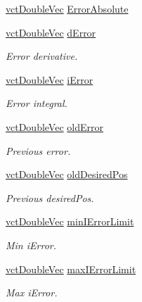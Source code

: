 \begin{DoxyCompactItemize}
\hyperlink{vct_dynamic_vector_types_8h_ade4b3068c86fb88f41af2e5187e491c2}{vct\-Double\-Vec} \hyperlink{classmts_p_i_d_abeb97a2bb603ecbe4636063effb6bf90}{Error\-Absolute}
\item 
\hyperlink{vct_dynamic_vector_types_8h_ade4b3068c86fb88f41af2e5187e491c2}{vct\-Double\-Vec} \hyperlink{classmts_p_i_d_ae171fb161398be9d69e7e647625c6cd6}{d\-Error}
\begin{DoxyCompactList}\small\item\em Error derivative. \end{DoxyCompactList}\item 
\hyperlink{vct_dynamic_vector_types_8h_ade4b3068c86fb88f41af2e5187e491c2}{vct\-Double\-Vec} \hyperlink{classmts_p_i_d_a89f471bbc0cb21cc9c64552a087c1a2c}{i\-Error}
\begin{DoxyCompactList}\small\item\em Error integral. \end{DoxyCompactList}\item 
\hyperlink{vct_dynamic_vector_types_8h_ade4b3068c86fb88f41af2e5187e491c2}{vct\-Double\-Vec} \hyperlink{classmts_p_i_d_ad9b05536756b06bd08374606fa615dc6}{old\-Error}
\begin{DoxyCompactList}\small\item\em Previous error. \end{DoxyCompactList}\item 
\hyperlink{vct_dynamic_vector_types_8h_ade4b3068c86fb88f41af2e5187e491c2}{vct\-Double\-Vec} \hyperlink{classmts_p_i_d_a9bd5876d1e7062eafd4dde4e2914adab}{old\-Desired\-Pos}
\begin{DoxyCompactList}\small\item\em Previous desired\-Pos. \end{DoxyCompactList}\item 
\hyperlink{vct_dynamic_vector_types_8h_ade4b3068c86fb88f41af2e5187e491c2}{vct\-Double\-Vec} \hyperlink{classmts_p_i_d_af87166f1f4a9f13c732be381f000d32a}{min\-I\-Error\-Limit}
\begin{DoxyCompactList}\small\item\em Min i\-Error. \end{DoxyCompactList}\item 
\hyperlink{vct_dynamic_vector_types_8h_ade4b3068c86fb88f41af2e5187e491c2}{vct\-Double\-Vec} \hyperlink{classmts_p_i_d_a15180d5531a92d2bd2d9ced43496165e}{max\-I\-Error\-Limit}
\begin{DoxyCompactList}\small\item\em Max i\-Error. \end{DoxyCompactList}\item 

\end{DoxyCompactItemize}
